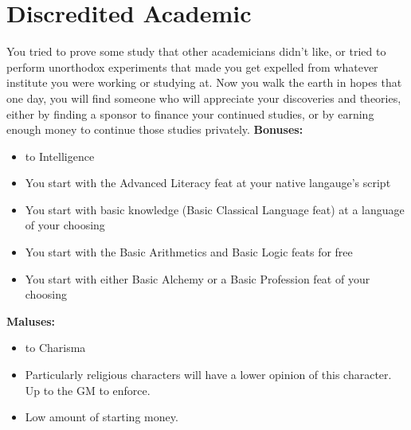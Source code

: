 \section{Discredited Academic}
You tried to prove some study that other academicians didn't like, or tried to perform unorthodox experiments that made you get expelled from whatever institute you were working or studying at. Now you walk the earth in hopes that one day, you will find someone who will appreciate your discoveries and theories, either by finding a sponsor to finance your continued studies, or by earning enough money to continue those studies privately.\newline
\textbf{Bonuses:}
\begin{itemize}
	\item {} to Intelligence
	\item You start with the Advanced Literacy feat at your native langauge's script
	\item You start with basic knowledge (Basic Classical Language feat) at a language of your choosing
	\item You start with the Basic Arithmetics and Basic Logic feats for free
	\item You start with either Basic Alchemy or a Basic Profession feat of your choosing
\end{itemize}
\textbf{Maluses:}
\begin{itemize}
	\item {} to Charisma
	\item Particularly religious characters will have a lower opinion of this character. Up to the GM to enforce.
	\item Low amount of starting money.
\end{itemize}
